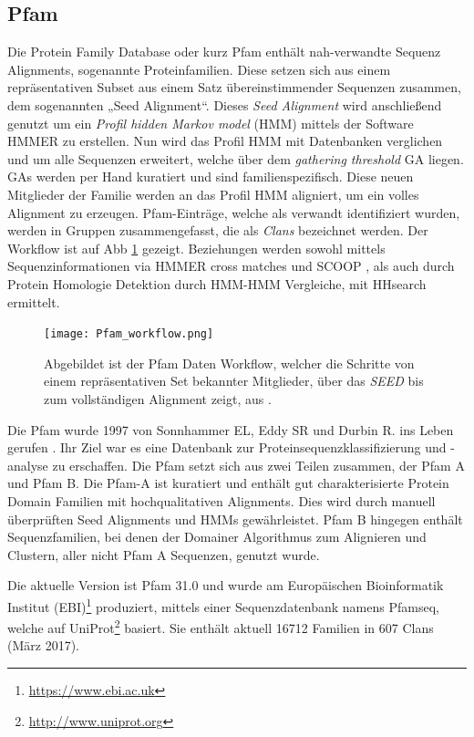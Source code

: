 \subsection{Pfam}
\label{sec:pfam}
Die Protein Family Database \cite{Finn.2014} oder kurz Pfam enthält nah-verwandte Sequenz Alignments, sogenannte Proteinfamilien. Diese setzen sich aus einem repräsentativen Subset aus einem Satz übereinstimmender Sequenzen zusammen, dem sogenannten „Seed Alignment“. Dieses \emph{Seed Alignment} wird anschließend genutzt um ein \emph{Profil hidden Markov model} (HMM) \cite{Soding.2005} mittels der Software HMMER \cite{Mistry.2013} zu erstellen. Nun wird das Profil HMM mit Datenbanken verglichen und um alle Sequenzen erweitert, welche über dem \emph{gathering threshold} GA liegen. GAs werden per Hand kuratiert und sind familienspezifisch. Diese neuen Mitglieder der Familie werden an das Profil HMM aligniert, um ein volles Alignment zu erzeugen. Pfam-Einträge, welche als verwandt identifiziert wurden, werden in Gruppen zusammengefasst, die als \emph{Clans} bezeichnet werden. Der Workflow ist auf \ac{Abb} \ref{fig:Pfam_workflow} gezeigt. Beziehungen werden sowohl mittels Sequenzinformationen via HMMER cross matches und SCOOP \cite{Bateman.2007}, als auch durch Protein Homologie Detektion durch HMM-HMM Vergleiche, mit HHsearch \cite{Fidler.2016} ermittelt.

\begin{figure}
\texttt{[image: Pfam\_workflow.png]}
\caption{Abgebildet ist der \ac{Pfam} Daten Workflow, welcher die Schritte von einem repräsentativen Set bekannter Mitglieder, über das \emph{SEED} bis zum vollständigen Alignment zeigt, aus \cite{Mathias.2014}.}
\label{fig:Pfam_workflow}
\end{figure}

Die Pfam wurde 1997 von Sonnhammer EL, Eddy SR und Durbin R. ins Leben gerufen \cite{Sonnhammer.1997}. Ihr Ziel war es eine Datenbank zur Proteinsequenzklassifizierung und -analyse zu erschaffen. Die Pfam setzt sich aus zwei Teilen zusammen, der Pfam A und Pfam B. Die Pfam-A ist kuratiert und enthält gut charakterisierte Protein Domain Familien mit hochqualitativen Alignments. Dies wird durch manuell überprüften Seed Alignments und HMMs gewährleistet. Pfam B hingegen enthält Sequenzfamilien, bei denen der Domainer Algorithmus zum Alignieren und Clustern, aller nicht Pfam A Sequenzen, genutzt wurde. 

Die aktuelle Version ist Pfam 31.0 und wurde am Europäischen Bioinformatik Institut (EBI)\footnote{\url{https://www.ebi.ac.uk}} produziert, mittels einer Sequenzdatenbank namens Pfamseq, welche auf UniProt\footnote{\url{http://www.uniprot.org}} basiert. Sie enthält aktuell 16712 Familien in 607 Clans (März 2017).


